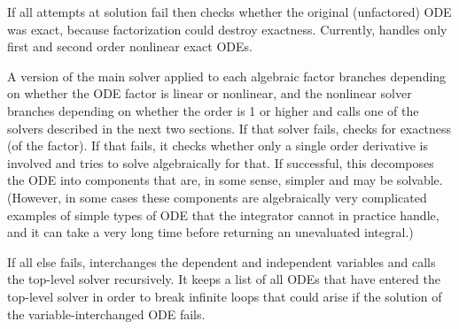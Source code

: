 If all attempts at solution fail then  checks whether the
original (unfactored) ODE was exact, because factorization could
destroy exactness.  Currently,  handles only first and
second order nonlinear exact ODEs.

A version of the main solver applied to each algebraic factor branches
depending on whether the ODE factor is linear or nonlinear, and the
nonlinear solver branches depending on whether the order is 1 or
higher and calls one of the solvers described in the next two
sections.  If that solver fails,  checks for exactness
(of the factor).  If that fails, it checks whether only a single order
derivative is involved and tries to solve algebraically for that.  If
successful, this decomposes the ODE into components that are, in some
sense, simpler and may be solvable.  (However, in some cases these
components are algebraically very complicated examples of simple types
of ODE that the integrator cannot in practice handle, and it can take
a very long time before returning an unevaluated integral.)

If all else fails,  interchanges the dependent and
independent variables and calls the top-level solver recursively.  It
keeps a list of all ODEs that have entered the top-level solver in
order to break infinite loops that could arise if the solution of the
variable-interchanged ODE fails.



